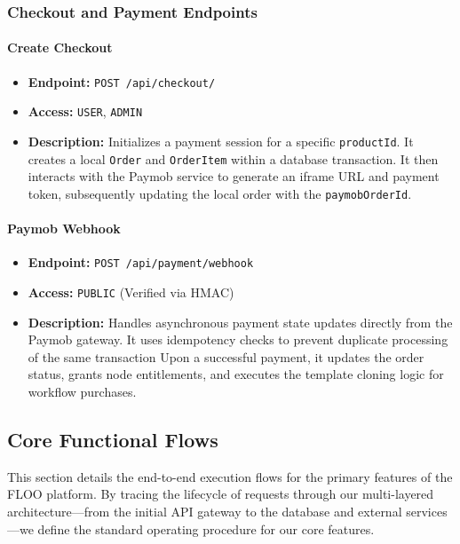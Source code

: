 \subsubsection{Checkout and Payment Endpoints}
\label{subsec:checkout-payment-endpoints}

\paragraph{Create Checkout}
\begin{itemize}
  \item \textbf{Endpoint:} \texttt{POST /api/checkout/}
  \item \textbf{Access:} \texttt{USER}, \texttt{ADMIN}
  \item \textbf{Description:} Initializes a payment session for a specific \texttt{productId}. It creates a local \texttt{Order} and \texttt{OrderItem} within a database transaction. It then interacts with the Paymob service to generate an iframe URL and payment token, subsequently updating the local order with the \texttt{paymobOrderId}.
\end{itemize}

\paragraph{Paymob Webhook}
\begin{itemize}
  \item \textbf{Endpoint:} \texttt{POST /api/payment/webhook}
  \item \textbf{Access:} \texttt{PUBLIC} (Verified via HMAC)
  \item \textbf{Description:} Handles asynchronous payment state updates directly from the Paymob gateway. It uses idempotency checks to prevent duplicate processing of the same transaction Upon a successful payment, it updates the order status, grants node entitlements, and executes the template cloning logic for workflow purchases.
\end{itemize}


\subsection{Core Functional Flows}

This section details the end-to-end execution flows for the primary features of the FLOO platform. By tracing the lifecycle of requests through our multi-layered architecture—from the initial API gateway to the database and external services—we define the standard operating procedure for our core features.

